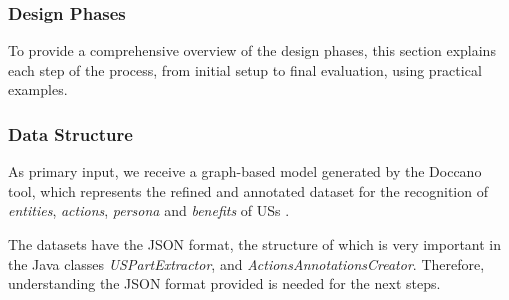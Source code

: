 \subsubsection*{Design Phases}\label{conflict_design_phases}
To provide a comprehensive overview of the design phases, this section explains each step of the process, from initial setup to final evaluation, using practical examples.
\subsubsection*{Data Structure}\label{conflict_design_step_0}
As primary input, we receive a graph-based model generated by the Doccano tool, which represents the refined and annotated dataset for the recognition of \emph{entities}, \emph{actions}, \emph{persona} and \emph{benefits} of USs \cite{arulmohan2023extracting}.

The datasets have the JSON format, the structure of which is very important in the Java classes \textit{USPartExtractor}, and \textit{ActionsAnnotationsCreator}. Therefore, understanding the JSON format provided is needed for the next steps.

